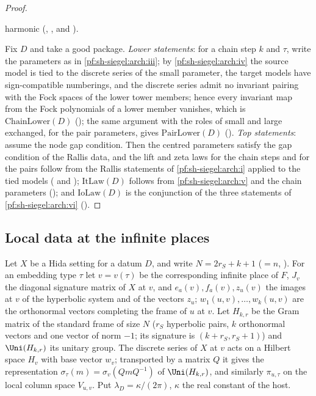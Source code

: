 \begin{proof}
\begin{enumerate}[label=(\roman*)]
harmonic (, , and ).
\end{enumerate}
Fix $D$ and take a good package. \emph{Lower statements}: for a chain step $k$ and $\tau$, write the parameters as in
\ref{pf:sh-siegel:arch:iii}; by \ref{pf:sh-siegel:arch:iv} the source model is tied to the discrete series of the small
parameter, the target models have sign-compatible numberings, and the discrete series admit no invariant pairing with the
Fock spaces of the lower tower members; hence every invariant map from the Fock polynomials of a lower member vanishes,
which is $\mathrm{ChainLower}(D)$ (); the same argument with the roles of
small and large exchanged, for the pair parameters, gives $\mathrm{PairLower}(D)$
(). \emph{Top statements}: assume the node gap condition. Then the centred
parameters satisfy the gap condition of the Rallis data, and the lift and zeta laws for the chain steps and for the pairs
follow from the Rallis statements of \ref{pf:sh-siegel:arch:i} applied to the tied models
( and ); $\mathrm{ItLaw}(D)$ follows from
\ref{pf:sh-siegel:arch:v} and the chain parameters (); and $\mathrm{IoLaw}(D)$ is
the conjunction of the three statements of \ref{pf:sh-siegel:arch:vi} ().
\end{proof}


\subsection{Local data at the infinite places}\label{sec:pf:sh-siegel:inf}

Let $X$ be a Hida setting for a datum $D$, and write $N=2r_S+k+1$ ($=n$, ).
For an embedding type $\tau$ let $v=v(\tau)$ be the corresponding infinite place of $F$, $J_v$ the diagonal signature
matrix of $X$ at $v$, and $e_a(v),f_a(v),z_u(v)$ the images at $v$ of the hyperbolic system and of the vectors $z_u$;
$w_1(u,v),\dots,w_k(u,v)$ are the orthonormal vectors completing the frame of $u$ at $v$. Let $H_{k,r}$ be the Gram
matrix of the standard frame of size $N$ ($r_S$ hyperbolic pairs, $k$ orthonormal vectors and one vector of norm $-1$;
its signature is $(k+r_S,r_S+1)$) and $\Uni(H_{k,r})$ its unitary group. The discrete series of $X$ at $v$ acts on a Hilbert space $H_v$ with
base vector $w_v$; transported by a matrix $Q$ it gives the representation $\sigma_\tau(m)=\sigma_v(QmQ^{-1})$ of
$\Uni(H_{k,r})$, and similarly $\pi_{u,\tau}$ on the local column space $V_{u,v}$. Put $\lambda_D=\kappa/(2\pi)$, $\kappa$ the
real constant of the host.

